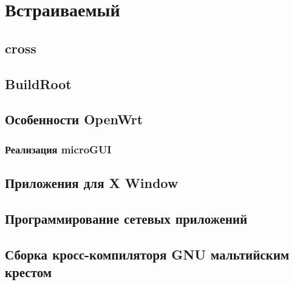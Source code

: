 \part{Встраиваемый \emlinux}









\chapter{cross}

\chapter{BuildRoot}

\chapter{Особенности OpenWrt}

\section{Реализация microGUI}

\chapter{Приложения для X Window}

\chapter{Программирование сетевых приложений}

\chapter{Сборка кросс-компиляторя GNU мальтийским крестом}
